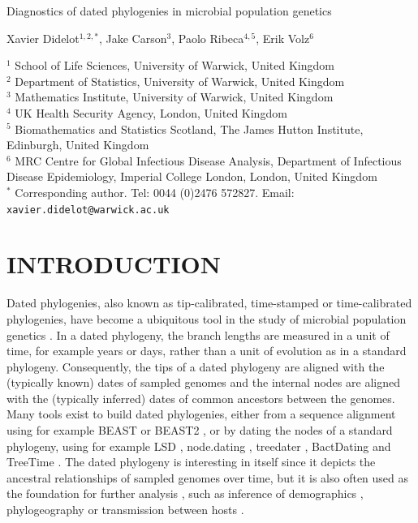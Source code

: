 \documentclass{article}
\begin{document}
{\Large Diagnostics of dated phylogenies in microbial population genetics}


\vspace*{2cm}
Xavier Didelot$^{1,2,*}$, Jake Carson$^{3}$, Paolo Ribeca$^{4,5}$, Erik Volz$^6$

\vspace*{2cm}
$^1$ School of Life Sciences, University of Warwick, United Kingdom\\
$^2$ Department of Statistics, University of Warwick, United Kingdom\\
$^3$ Mathematics Institute, University of Warwick, United Kingdom\\
$^4$ UK Health Security Agency, London, United Kingdom\\
$^5$ Biomathematics and Statistics Scotland, The James Hutton Institute, Edinburgh, United Kingdom\\
$^6$ MRC Centre for Global Infectious Disease Analysis, Department of Infectious Disease Epidemiology, Imperial College London, London, United Kingdom\\
$^*$ Corresponding author. Tel: 0044 (0)2476 572827. Email: \verb+xavier.didelot@warwick.ac.uk+


\newpage
\section*{INTRODUCTION}

Dated phylogenies, also known as tip-calibrated, time-stamped or time-calibrated phylogenies, have become a ubiquitous tool in the study of microbial population genetics 
\citep{Drummond2003,Biek2015,rieuxInferencesTipcalibratedPhylogenies2016}. In a dated phylogeny, the branch lengths are measured in a unit of time, for example years or days,
rather than a unit of evolution as in a standard phylogeny. Consequently, the tips of a dated phylogeny are aligned with the (typically known) dates of sampled genomes and
the internal nodes are aligned with the (typically inferred) dates of common ancestors between the genomes.
Many tools exist to build dated phylogenies, either from a sequence alignment using for example BEAST \citep{Suchard2018} or BEAST2 \citep{Bouckaert2019}, or by
dating the nodes of a standard phylogeny, using for example 
LSD \citep{To2016}, node.dating \citep{Jones2017}, treedater \citep{Volz2017}, BactDating \citep{Didelot2018} and TreeTime \citep{Sagulenko2018}.
The dated phylogeny is interesting in itself since it depicts the ancestral relationships of sampled genomes
over time, but it is also often used as the foundation for further analysis \citep{Didelot2022}, such as inference
of demographics \citep{Baele2016}, phylogeography \citep{Lemey2009} 
or transmission between hosts \citep{Didelot2017}.
\end{document}
